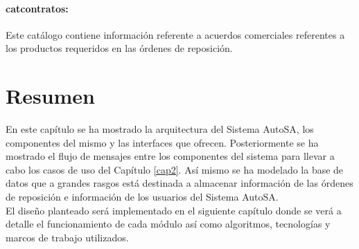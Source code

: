 \paragraph{cat{\textunderscore}contratos:} Este catálogo contiene información referente a acuerdos comerciales referentes a los productos requeridos en las órdenes de reposición.


\section{Resumen}
En este capítulo se ha mostrado la arquitectura del Sistema AutoSA, los componentes del mismo y las interfaces que ofrecen. Posteriormente se ha mostrado el flujo de mensajes entre los componentes del sistema para llevar a cabo los casos de uso del Capítulo \ref{cap2}. Así mismo se ha modelado la base de datos que a grandes rasgos está destinada a almacenar información de las órdenes de reposición e información de los usuarios del Sistema AutoSA.\\
El diseño planteado será implementado en el siguiente capítulo donde se verá a detalle el funcionamiento de cada módulo así como algoritmos, tecnologías y marcos de trabajo utilizados. 